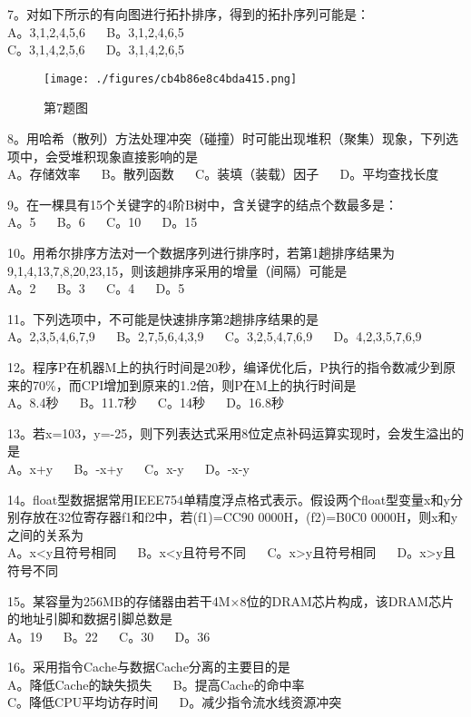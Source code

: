 7。对如下所示的有向图进行拓扑排序，得到的拓扑序列可能是： \\
A。3,1,2,4,5,6 $\quad$ B。3,1,2,4,6,5 \\
C。3,1,4,2,5,6 $\quad$ D。3,1,4,2,6,5
\begin{figure}[ht]
\centering
\texttt{[image: ./figures/cb4b86e8c4bda415.png]}
\caption{第7题图} \label{fig_CSN14_2}
\end{figure}

8。用哈希（散列）方法处理冲突（碰撞）时可能出现堆积（聚集）现象，下列选项中，会受堆积现象直接影响的是 \\
A。存储效率 $\quad$ B。散列函数 $\quad$ C。装填（装载）因子 $\quad$ D。平均查找长度

9。在一棵具有15个关键字的4阶B树中，含关键字的结点个数最多是： \\
A。5 $\quad$ B。6 $\quad$ C。10 $\quad$ D。15

10。用希尔排序方法对一个数据序列进行排序时，若第1趟排序结果为9,1,4,13,7,8,20,23,15，则该趟排序采用的增量（间隔）可能是 \\
A。2 $\quad$ B。3 $\quad$ C。4 $\quad$ D。5

11。下列选项中，不可能是快速排序第2趟排序结果的是 \\
A。2,3,5,4,6,7,9 $\quad$ B。2,7,5,6,4,3,9 $\quad$ C。3,2,5,4,7,6,9 $\quad$ D。4,2,3,5,7,6,9

12。程序P在机器M上的执行时间是20秒，编译优化后，P执行的指令数减少到原来的70\%，而CPI增加到原来的1.2倍，则P在M上的执行时间是 \\
A。8.4秒 $\quad$ B。11.7秒 $\quad$ C。14秒 $\quad$ D。16.8秒

13。若x=103，y=-25，则下列表达式采用8位定点补码运算实现时，会发生溢出的是 \\
A。x+y $\quad$ B。-x+y $\quad$ C。x-y $\quad$ D。-x-y

14。float型数据据常用IEEE754单精度浮点格式表示。假设两个float型变量x和y分别存放在32位寄存器f1和f2中，若(f1)=CC90 0000H，(f2)=B0C0 0000H，则x和y之间的关系为 \\
A。x<y且符号相同 $\quad$ B。x<y且符号不同 $\quad$ C。x>y且符号相同 $\quad$ D。x>y且符号不同

15。某容量为256MB的存储器由若干4M×8位的DRAM芯片构成，该DRAM芯片的地址引脚和数据引脚总数是 \\
A。19 $\quad$ B。22 $\quad$ C。30 $\quad$ D。36

16。采用指令Cache与数据Cache分离的主要目的是 \\
A。降低Cache的缺失损失 $\quad$ B。提高Cache的命中率 \\
C。降低CPU平均访存时间 $\quad$ D。减少指令流水线资源冲突


